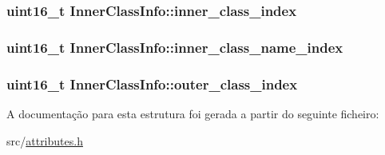 \subsubsection[{\texorpdfstring{inner\+\_\+class\+\_\+index}{inner_class_index}}]{\setlength{\rightskip}{0pt plus 5cm}uint16\+\_\+t Inner\+Class\+Info\+::inner\+\_\+class\+\_\+index}\hypertarget{structInnerClassInfo_a3383bc5bea2999b6bd91b9dfc095264f}{}\label{structInnerClassInfo_a3383bc5bea2999b6bd91b9dfc095264f}
\subsubsection[{\texorpdfstring{inner\+\_\+class\+\_\+name\+\_\+index}{inner_class_name_index}}]{\setlength{\rightskip}{0pt plus 5cm}uint16\+\_\+t Inner\+Class\+Info\+::inner\+\_\+class\+\_\+name\+\_\+index}\hypertarget{structInnerClassInfo_a6d008047cb2df8aa856666169f625026}{}\label{structInnerClassInfo_a6d008047cb2df8aa856666169f625026}
\subsubsection[{\texorpdfstring{outer\+\_\+class\+\_\+index}{outer_class_index}}]{\setlength{\rightskip}{0pt plus 5cm}uint16\+\_\+t Inner\+Class\+Info\+::outer\+\_\+class\+\_\+index}\hypertarget{structInnerClassInfo_a8449c27dc3cac6e437f4e1c1132ea229}{}\label{structInnerClassInfo_a8449c27dc3cac6e437f4e1c1132ea229}


A documentação para esta estrutura foi gerada a partir do seguinte ficheiro\+:\begin{DoxyCompactItemize}
\item 
src/\hyperlink{attributes_8h}{attributes.\+h}\end{DoxyCompactItemize}
